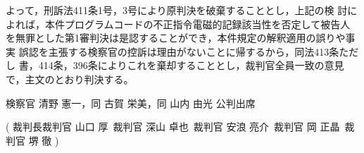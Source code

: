 \documentclass[12pt,a4paper]{ltjsarticle}
\begin{document}
 よって，刑訴法411条1号，3号により原判決を破棄することとし，上記の検
 討によれば，本件プログラムコードの不正指令電磁的記録該当性を否定して被告人
 を無罪とした第1審判決は是認することができ，本件規定の解釈適用の誤りや事実
 誤認を主張する検察官の控訴は理由がないことに帰するから，同法413条ただし
 書，414条，396条によりこれを棄却することとし，裁判官全員一致の意見
 で，主文のとおり判決する。

 検察官 清野 憲一，同 古賀 栄美，同 山内 由光 公判出席

 (
 裁判長裁判官 山口 厚\
 裁判官 深山 卓也\
 裁判官 安浪 亮介\
 裁判官 岡 正晶\
 裁判官 堺 徹
   )
\end{document}

